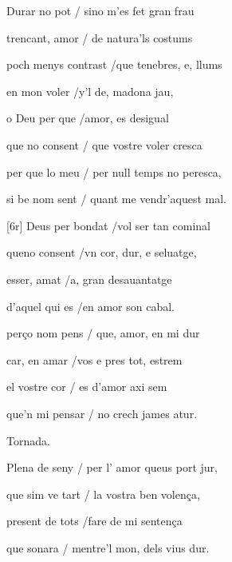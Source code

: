 \documentclass[12pt]{article}
\begin{document}
\begin{estrofa}

 Durar no pot / sino m'es fet gran frau

 trencant, amor / de natura'ls costums

 poch menys contrast /que tenebres, e, llums

 en mon voler /y'l de, madona jau,

 o Deu per que /amor, es desigual

 que no consent / que vostre voler cresca

 per que lo meu / per null temps no peresca,

 si be nom sent / quant me vendr'aquest mal.

\end{estrofa}



\begin{estrofa}

 [6r] Deus per bondat /vol ser tan cominal

 queno consent /vn cor, dur, e seluatge,

 esser, amat /a, gran desauantatge

 d'aquel qui es /en amor son cabal.

 per\c{c}o nom pens / que, amor, en mi dur

 car, en amar /vos e pres tot, estrem

 el vostre cor / es d'amor axi sem

 que'n mi pensar / no crech james atur.

\end{estrofa}


\begin{estrofaExtra}%




\begin{tornada}

Tornada.

\end{tornada}


\end{estrofaExtra}


\begin{estrofa}

 Plena de seny / per l' amor queus port jur,

 que sim ve tart / la vostra ben volen\c{c}a,

 present de tots /fare de mi senten\c{c}a

 que sonara / mentre'l mon, dels vius dur.

\end{estrofa}
\end{document}
